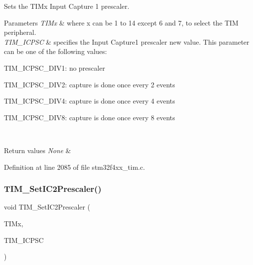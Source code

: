 Sets the T\+I\+Mx Input Capture 1 prescaler. 


\begin{DoxyParams}{Parameters}
{\em T\+I\+Mx} & where x can be 1 to 14 except 6 and 7, to select the T\+IM peripheral. \\
\hline
{\em T\+I\+M\+\_\+\+I\+C\+P\+SC} & specifies the Input Capture1 prescaler new value. This parameter can be one of the following values\+: \begin{DoxyItemize}
\item T\+I\+M\+\_\+\+I\+C\+P\+S\+C\+\_\+\+D\+I\+V1\+: no prescaler \item T\+I\+M\+\_\+\+I\+C\+P\+S\+C\+\_\+\+D\+I\+V2\+: capture is done once every 2 events \item T\+I\+M\+\_\+\+I\+C\+P\+S\+C\+\_\+\+D\+I\+V4\+: capture is done once every 4 events \item T\+I\+M\+\_\+\+I\+C\+P\+S\+C\+\_\+\+D\+I\+V8\+: capture is done once every 8 events \end{DoxyItemize}
\\
\hline
\end{DoxyParams}

\begin{DoxyRetVals}{Return values}
{\em None} & \\
\hline
\end{DoxyRetVals}


Definition at line 2085 of file stm32f4xx\+\_\+tim.\+c.

\mbox{\label{group___t_i_m_ga3cc4869b5fe73271808512c89322a325}} 
\subsubsection{\texorpdfstring{T\+I\+M\+\_\+\+Set\+I\+C2\+Prescaler()}{TIM\_SetIC2Prescaler()}}
{\footnotesize\ttfamily void T\+I\+M\+\_\+\+Set\+I\+C2\+Prescaler (\begin{DoxyParamCaption}\item[{\hyperlink{struct_t_i_m___type_def}{T\+I\+M\+\_\+\+Type\+Def} $\ast$}]{T\+I\+Mx,  }\item[{uint16\+\_\+t}]{T\+I\+M\+\_\+\+I\+C\+P\+SC }\end{DoxyParamCaption})}



